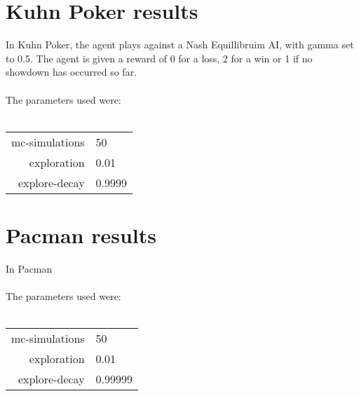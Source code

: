 \documentclass[pdftex,twoside,a4paper]{report}
\begin{document}

\section{Kuhn Poker results}
In Kuhn Poker, the agent plays against a Nash Equillibruim AI, with gamma set to 0.5. The agent is given a reward of 0 for a loss, 2 for a win or 1 if no showdown has occurred so far.\\\\
The parameters used were:\\\\
\begin{tabular}{| r | l | }
\hline
mc-simulations & 50\\
exploration & 0.01\\
explore-decay & 0.9999\\
\hline
\end{tabular}


\section{Pacman results}
In Pacman\\\\
The parameters used were:\\\\
\begin{tabular}{| r | l | }
\hline
mc-simulations & 50\\
exploration & 0.01\\
explore-decay & 0.99999\\
\hline
\end{tabular}
\end{document}
